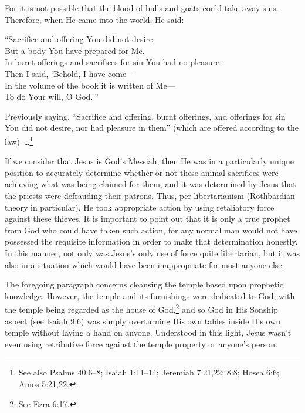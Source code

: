 \documentclass[letterpaper,12pt]{article}
\newenvironment{squotation}
  {\small\quotation}
  {\endquotation\normalsize}
\newenvironment{sverse}
  {\small\verse}
  {\endverse\normalsize}
\begin{document}
\begin{squotation}
For it is not possible that the blood of bulls and goats could take away sins. Therefore, when He came into the world, He said:

\begin{sverse}
``Sacrifice and offering You did not desire,\\
But a body You have prepared for Me.\\
In burnt offerings and sacrifices for sin You had no pleasure.\\
Then I said, `Behold, I have come---\\
In the volume of the book it is written of Me---\\
To do Your will, O God.'\thinspace''
\end{sverse}

Previously saying, ``Sacrifice and offering, burnt offerings, and offerings for sin You did not desire, nor had pleasure in them'' (which are offered according to the \mbox{law) \ldots}\footnote{See also Psalms 40:6--8; Isaiah 1:11--14; Jeremiah 7:21,22; 8:8; Hosea 6:6; Amos 5:21,22.}
\end{squotation}

If we consider that Jesus is God's Messiah, then He was in a particularly unique position to accurately determine whether or not these animal sacrifices were achieving what was being claimed for them, and it was determined by Jesus that the priests were defrauding their patrons. Thus, per libertarianism (Rothbardian theory in particular), He took appropriate action by using retaliatory force against these thieves. It is important to point out that it is only a true prophet from God who could have taken such action, for any normal man would not have possessed the requisite information in order to make that determination honestly. In this manner, not only was Jesus's only use of force quite libertarian, but it was also in a situation which would have been inappropriate for most anyone else.

The foregoing paragraph concerns cleansing the temple based upon prophetic knowledge. However, the temple and its furnishings were dedicated to God, with the temple being regarded as the house of God,\footnote{See Ezra 6:17.} and so God in His Sonship aspect (see Isaiah 9:6) was simply overturning His own tables inside His own temple without laying a hand on anyone. Understood in this light, Jesus wasn't even using retributive force against the temple property or anyone's person.
\end{document}
